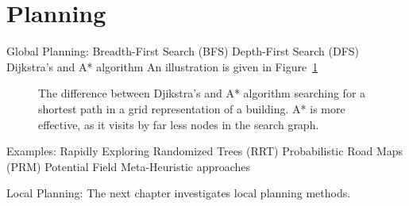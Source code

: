 \section{Planning}\label{sec:global}
Global Planning:
Breadth-First Search (BFS)
Depth-First Search (DFS)
Dijkstra's and A* algorithm
An illustration is given in Figure~\ref{fig:fig_overview}
\begin{figure}[thpb]
	  \myfloatalign
      \footnotesize
      \centering
    
   \caption[Djikstra's and A* algorithm.]{The difference between Djikstra's and A* algorithm searching for a shortest path in a grid representation of a building. A* is more effective, as it visits by far less nodes in the search graph. }
\label{fig:fig_overview}
\end{figure}
Examples: 
Rapidly Exploring Randomized Trees (RRT)
Probabilistic Road Maps (PRM)
Potential Field
Meta-Heuristic approaches

Local Planning:
The next chapter investigates local planning methods.





